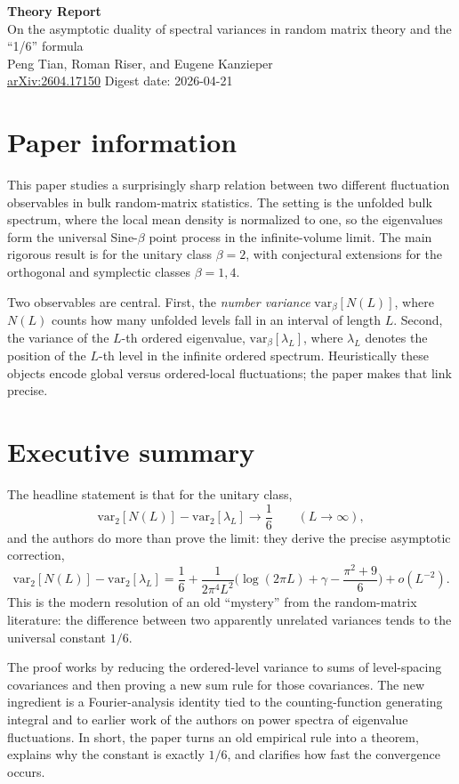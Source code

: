 \documentclass[11pt]{article}
\begin{document}
\begin{center}
{\Large \textbf{Theory Report}}\\[0.4em]
{\large On the asymptotic duality of spectral variances in random matrix theory and the ``1/6'' formula}\\[0.5em]
Peng Tian, Roman Riser, and Eugene Kanzieper\\
\href{https://arxiv.org/abs/2604.17150}{arXiv:2604.17150} \hspace{1em} Digest date: 2026-04-21
\end{center}

\section*{Paper information}
This paper studies a surprisingly sharp relation between two different fluctuation observables in bulk random-matrix statistics. The setting is the unfolded bulk spectrum, where the local mean density is normalized to one, so the eigenvalues form the universal Sine-$\beta$ point process in the infinite-volume limit. The main rigorous result is for the unitary class $\beta=2$, with conjectural extensions for the orthogonal and symplectic classes $\beta=1,4$.

Two observables are central. First, the \emph{number variance} $\mathrm{var}_{\beta}[N(L)]$, where $N(L)$ counts how many unfolded levels fall in an interval of length $L$. Second, the variance of the $L$-th ordered eigenvalue, $\mathrm{var}_{\beta}[\lambda_L]$, where $\lambda_L$ denotes the position of the $L$-th level in the infinite ordered spectrum. Heuristically these objects encode global versus ordered-local fluctuations; the paper makes that link precise.

\section*{Executive summary}
The headline statement is that for the unitary class,
\[
\mathrm{var}_2[N(L)]-\mathrm{var}_2[\lambda_L] \to \frac16 \qquad (L\to\infty),
\]
and the authors do more than prove the limit: they derive the precise asymptotic correction,
\[
\mathrm{var}_2[N(L)]-\mathrm{var}_2[\lambda_L]
= \frac16 + \frac{1}{2\pi^4 L^2}\Big(\log(2\pi L)+\gamma-\frac{\pi^2+9}{6}\Big)+o(L^{-2}).
\]
This is the modern resolution of an old ``mystery'' from the random-matrix literature: the difference between two apparently unrelated variances tends to the universal constant $1/6$.

The proof works by reducing the ordered-level variance to sums of level-spacing covariances and then proving a new sum rule for those covariances. The new ingredient is a Fourier-analysis identity tied to the counting-function generating integral and to earlier work of the authors on power spectra of eigenvalue fluctuations. In short, the paper turns an old empirical rule into a theorem, explains why the constant is exactly $1/6$, and clarifies how fast the convergence occurs.
\end{document}

